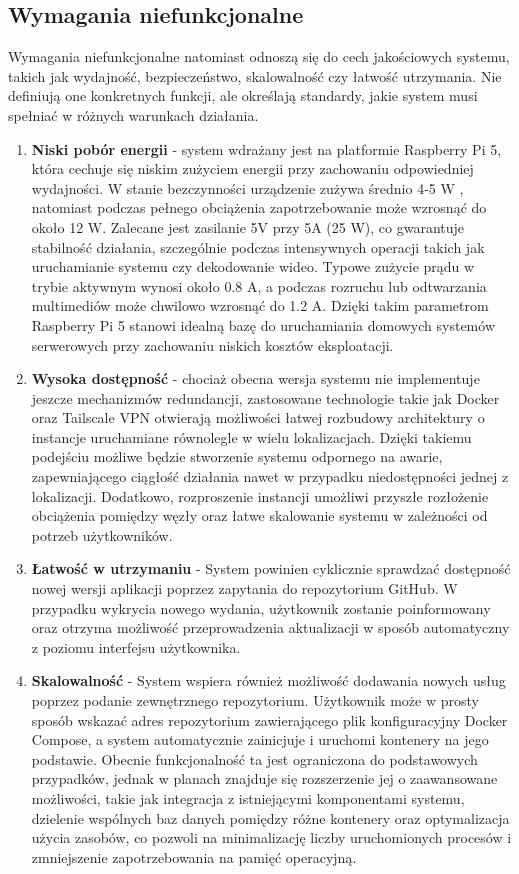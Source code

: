 \subsection{Wymagania niefunkcjonalne}

Wymagania niefunkcjonalne natomiast odnoszą się do cech jakościowych systemu, takich jak wydajność, bezpieczeństwo, skalowalność czy łatwość utrzymania. Nie definiują one konkretnych funkcji, ale określają standardy, jakie system musi spełniać w różnych warunkach działania.

\begin{enumerate}
    \item \textbf{Niski pobór energii} - system wdrażany jest na platformie Raspberry Pi 5, która cechuje się niskim zużyciem energii przy zachowaniu odpowiedniej wydajności. W stanie bezczynności urządzenie zużywa średnio 4-5 W \cite{RaspberryPiPowerConsumption}, natomiast podczas pełnego obciążenia zapotrzebowanie może wzrosnąć do około 12 W. Zalecane jest zasilanie 5V przy 5A (25 W), co gwarantuje stabilność działania, szczególnie podczas intensywnych operacji takich jak uruchamianie systemu czy dekodowanie wideo. Typowe zużycie prądu w trybie aktywnym wynosi około 0.8 A, a podczas rozruchu lub odtwarzania multimediów może chwilowo wzrosnąć do 1.2 A. Dzięki takim parametrom Raspberry Pi 5 stanowi idealną bazę do uruchamiania domowych systemów serwerowych przy zachowaniu niskich kosztów eksploatacji.
    \item \textbf{Wysoka dostępność} - chociaż obecna wersja systemu nie implementuje jeszcze mechanizmów redundancji, zastosowane technologie takie jak Docker oraz Tailscale VPN otwierają możliwości łatwej rozbudowy architektury o instancje uruchamiane równolegle w wielu lokalizacjach. Dzięki takiemu podejściu możliwe będzie stworzenie systemu odpornego na awarie, zapewniającego ciągłość działania nawet w przypadku niedostępności jednej z lokalizacji. Dodatkowo, rozproszenie instancji umożliwi przyszłe rozłożenie obciążenia pomiędzy węzły oraz łatwe skalowanie systemu w zależności od potrzeb użytkowników.
    \item \textbf{Łatwość w utrzymaniu} - System powinien cyklicznie sprawdzać dostępność nowej wersji aplikacji poprzez zapytania do repozytorium GitHub. W przypadku wykrycia nowego wydania, użytkownik zostanie poinformowany oraz otrzyma możliwość przeprowadzenia aktualizacji w sposób automatyczny z poziomu interfejsu użytkownika.
    \item \textbf{Skalowalność} - System wspiera również możliwość dodawania nowych usług poprzez podanie zewnętrznego repozytorium. Użytkownik może w prosty sposób wskazać adres repozytorium zawierającego plik konfiguracyjny Docker Compose, a system automatycznie zainicjuje i uruchomi kontenery na jego podstawie. Obecnie funkcjonalność ta jest ograniczona do podstawowych przypadków, jednak w planach znajduje się rozszerzenie jej o zaawansowane możliwości, takie jak integracja z istniejącymi komponentami systemu, dzielenie wspólnych baz danych pomiędzy różne kontenery oraz optymalizacja użycia zasobów, co pozwoli na minimalizację liczby uruchomionych procesów i zmniejszenie zapotrzebowania na pamięć operacyjną.

\end{enumerate}

